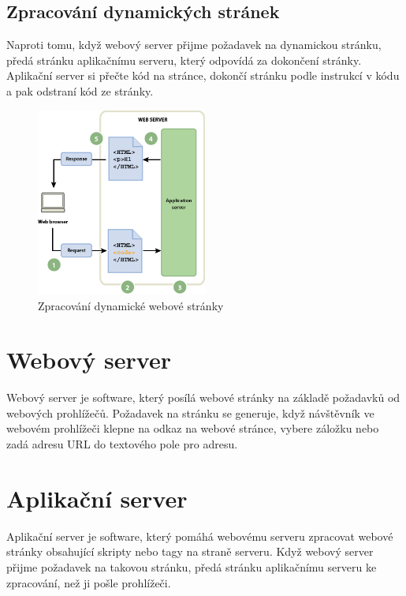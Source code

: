 \documentclass[12pt, a4paper,
twoside,        %
openright
]{report}
\begin{document}
\subsection{Zpracování dynamických stránek}
Naproti tomu, když webový server přijme požadavek na dynamickou stránku, předá stránku aplikačnímu serveru, který odpovídá za dokončení stránky. Aplikační server si přečte kód na stránce, dokončí stránku podle instrukcí v kódu a pak odstraní kód ze stránky.
	\begin{figure}[h!]
		\centering
		\includegraphics[width=0.5\textwidth]{image/dynamicke.png}
		\caption{Zpracování dynamické webové stránky}
		\label{fig:dynamickastranka}
	\end{figure}

\section{Webový server}
\label{webovyserver}

Webový server je software, který posílá webové stránky na základě požadavků od webových prohlížečů. Požadavek na stránku se generuje, když návštěvník ve webovém prohlížeči klepne na odkaz na webové stránce, vybere záložku nebo zadá adresu URL do textového pole pro adresu.

\section{Aplikační server}
\label{aplikacniserver}

Aplikační server je software, který pomáhá webovému serveru zpracovat webové stránky obsahující skripty nebo tagy na straně serveru. Když webový server přijme požadavek na takovou stránku, předá stránku aplikačnímu serveru ke zpracování, než ji pošle prohlížeči.

\newpage
\end{document}
